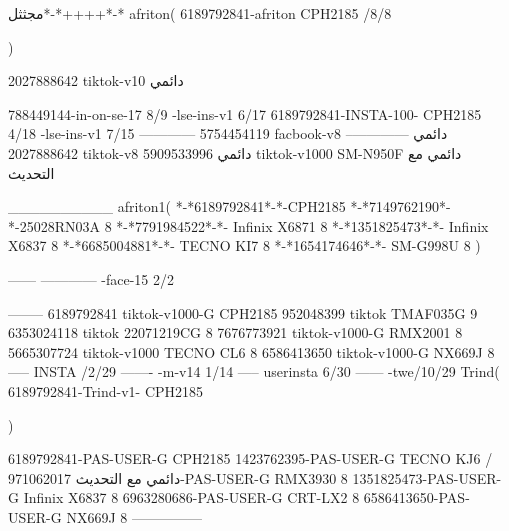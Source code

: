 مجثثل*-*++++*-*
afriton(
6189792841-afriton CPH2185  /8/8

)

2027888642 tiktok-v10
دائمي

788449144-in-on-se-17 8/9
-lse-ins-v1 6/17
6189792841-INSTA-100- CPH2185 4/18
-lse-ins-v1 7/15
------------
5754454119 facbook-v8
دائمي
--------------
2027888642 tiktok-v8
دائمي
5909533996 tiktok-v1000  SM-N950F
دائمي مع التحديث

__________
afriton1(
*-*6189792841*-*-CPH2185
*-*7149762190*-*-25028RN03A  8
*-*7791984522*-*- Infinix X6871  8
*-*1351825473*-*-  Infinix X6837   8
*-*6685004881*-*- TECNO KI7   8
*-*1654174646*-*- SM-G998U   8
)


------
------------
-face-15 2/2

--------
6189792841 tiktok-v1000-G CPH2185 
952048399 tiktok TMAF035G 9
6353024118 tiktok 22071219CG 8
7676773921 tiktok-v1000-G RMX2001  8
5665307724 tiktok-v1000 TECNO CL6  8
6586413650 tiktok-v1000-G NX669J  8
-----
 INSTA /2/29
-------
-m-v14 1/14
-----
userinsta 6/30
------
-twe/10/29
Trind(
6189792841-Trind-v1- CPH2185 

)


6189792841-PAS-USER-G CPH2185 
1423762395-PAS-USER-G TECNO KJ6  /دائمي مع التحديث
971062017-PAS-USER-G RMX3930 8
1351825473-PAS-USER-G  Infinix X6837  8
6963280686-PAS-USER-G  CRT-LX2  8
6586413650-PAS-USER-G  NX669J  8
    ---------------
